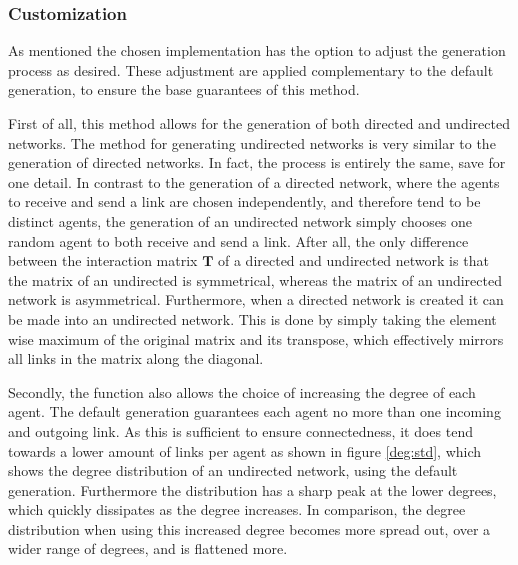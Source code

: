 \documentclass{article}
\newcommand{\T}{\textbf{T}}
\begin{document}
\subsubsection{Customization}

As mentioned the chosen implementation has the option to adjust the generation process as desired. These adjustment are applied complementary to the default generation, to ensure the base guarantees of this method. \newline

First of all, this method allows for the generation of both directed and undirected networks. The method for generating undirected networks is very similar to the generation of directed networks. In fact, the process is entirely the same, save for one detail. In contrast to the generation of a directed network, where the agents to receive and send a link are chosen independently, and therefore tend to be distinct agents, the generation of an undirected network simply chooses one random agent to both receive and send a link. After all, the only difference between the interaction matrix $\T$ of a directed and undirected network is that the matrix of an undirected is symmetrical, whereas the matrix of an undirected network is asymmetrical. \newline
Furthermore, when a directed network is created it can be made into an undirected network. This is done by simply taking the element wise maximum of the original matrix and its transpose, which effectively mirrors all links in the matrix along the diagonal. \newline

Secondly, the function also allows the choice of increasing the degree of each agent. The default generation guarantees each agent no more than one incoming and outgoing link. As this is sufficient to ensure connectedness, it does tend towards a lower amount of links per agent as shown in figure \ref{deg:std}, which shows the degree distribution of an undirected network, using the default generation. Furthermore the distribution has a sharp peak at the lower degrees, which quickly dissipates as the degree increases. In comparison, the degree distribution when using this increased degree becomes more spread out, over a wider range of degrees, and is flattened more.
\end{document}

